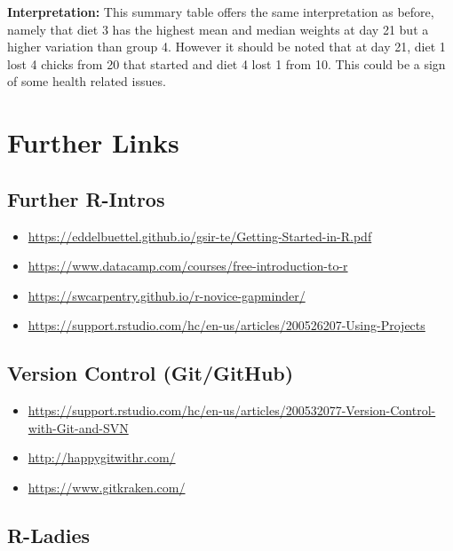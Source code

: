 \documentclass[
]{book}
\begin{document}
\textbf{Interpretation:}
This summary table offers the same interpretation as before, namely that diet 3 has the
highest mean and median weights at day 21 but a higher variation than group 4.
However it should be noted that at day 21, diet 1 lost 4 chicks from 20 that started
and diet 4 lost 1 from 10. This could be a sign of some health related issues.

\hypertarget{further-links}{%
\section{Further Links}\label{further-links}}

\hypertarget{further-r-intros}{%
\subsection{Further R-Intros}\label{further-r-intros}}

\begin{itemize}
\item
  \url{https://eddelbuettel.github.io/gsir-te/Getting-Started-in-R.pdf}
\item
  \url{https://www.datacamp.com/courses/free-introduction-to-r}
\item
  \url{https://swcarpentry.github.io/r-novice-gapminder/}
\item
  \url{https://support.rstudio.com/hc/en-us/articles/200526207-Using-Projects}
\end{itemize}

\hypertarget{version-control-gitgithub}{%
\subsection{Version Control (Git/GitHub)}\label{version-control-gitgithub}}

\begin{itemize}
\item
  \url{https://support.rstudio.com/hc/en-us/articles/200532077-Version-Control-with-Git-and-SVN}
\item
  \url{http://happygitwithr.com/}
\item
  \url{https://www.gitkraken.com/}
\end{itemize}

\hypertarget{r-ladies}{%
\subsection{R-Ladies}\label{r-ladies}}
\end{document}
